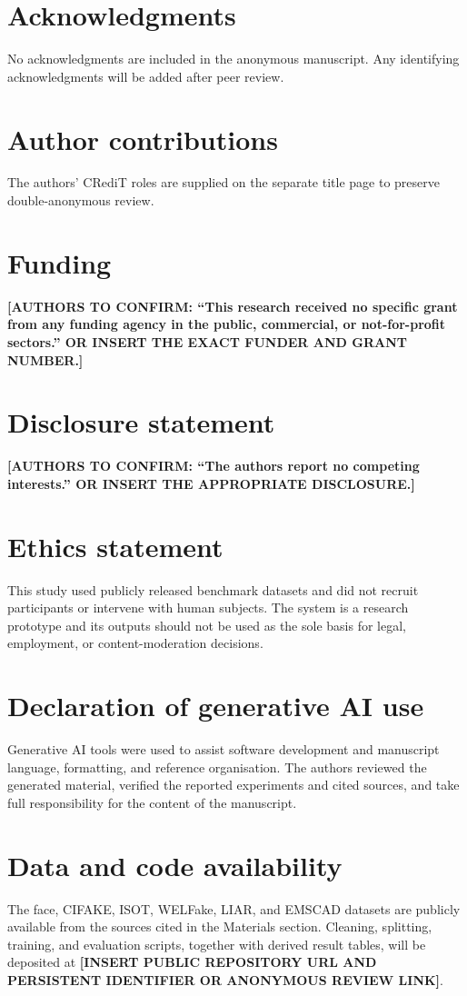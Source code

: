 \documentclass[11pt,a4paper]{article}
\begin{document}
\section*{Acknowledgments}
No acknowledgments are included in the anonymous manuscript. Any identifying acknowledgments will
be added after peer review.

\section*{Author contributions}
The authors' CRediT roles are supplied on the separate title page to preserve double-anonymous review.

\section*{Funding}
\textbf{[AUTHORS TO CONFIRM: ``This research received no specific grant from any funding agency in
the public, commercial, or not-for-profit sectors.'' OR INSERT THE EXACT FUNDER AND GRANT NUMBER.]}

\section*{Disclosure statement}
\textbf{[AUTHORS TO CONFIRM: ``The authors report no competing interests.'' OR INSERT THE
APPROPRIATE DISCLOSURE.]}

\section*{Ethics statement}
This study used publicly released benchmark datasets and did not recruit participants or intervene
with human subjects. The system is a research prototype and its outputs should not be used as the
sole basis for legal, employment, or content-moderation decisions.

\section*{Declaration of generative AI use}
Generative AI tools were used to assist software development and manuscript language, formatting,
and reference organisation. The authors reviewed the generated material, verified the reported
experiments and cited sources, and take full responsibility for the content of the manuscript.

\section*{Data and code availability}
The face, CIFAKE, ISOT, WELFake, LIAR, and EMSCAD datasets are publicly available from the sources
cited in the Materials section. Cleaning, splitting, training, and evaluation scripts, together
with derived result tables, will be deposited at \textbf{[INSERT PUBLIC REPOSITORY URL AND
PERSISTENT IDENTIFIER OR ANONYMOUS REVIEW LINK]}.



\end{document}
